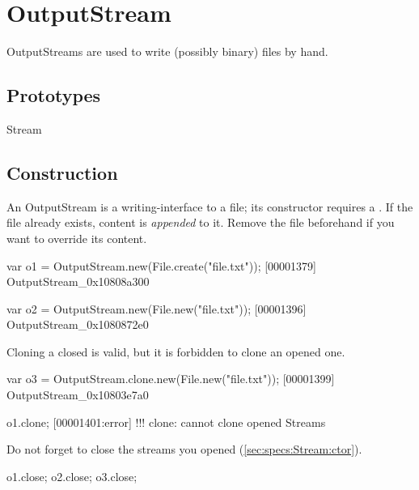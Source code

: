 
\section{OutputStream}

OutputStreams are used to write (possibly binary) files by hand.

\subsection{Prototypes}
\begin{refObjects}
\item[Stream]
\end{refObjects}

\subsection{Construction}
\label{sec:specs:OutputStream:ctor}

An OutputStream is a writing-interface to a file; its constructor
requires a .  If the file already exists, content is
\emph{appended} to it.  Remove the file beforehand if you want to
override its content.

\begin{urbiscript}
var o1 = OutputStream.new(File.create("file.txt"));
[00001379] OutputStream_0x10808a300

var o2 = OutputStream.new(File.new("file.txt"));
[00001396] OutputStream_0x1080872e0
\end{urbiscript}

Cloning a closed  is valid, but it is forbidden to clone an
opened one.

\begin{urbiscript}
var o3 = OutputStream.clone.new(File.new("file.txt"));
[00001399] OutputStream_0x10803e7a0

o1.clone;
[00001401:error] !!! clone: cannot clone opened Streams
\end{urbiscript}

Do not forget to close the streams you opened
(\autoref{sec:specs:Stream:ctor}).

\begin{urbiscript}
o1.close;
o2.close;
o3.close;
\end{urbiscript}

